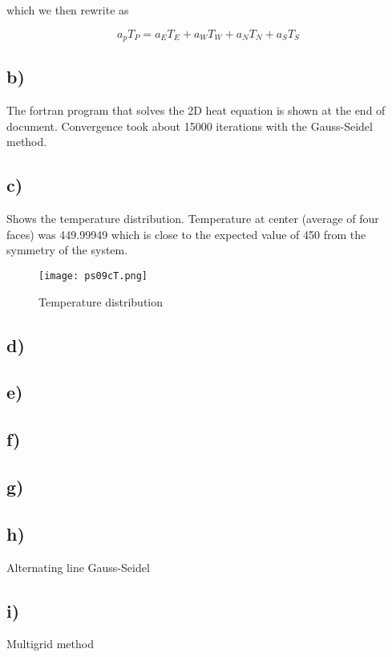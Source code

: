 \documentclass{article}
\begin{document}
which we then rewrite as

\begin{equation}
a_p T_P = a_E T_E + a_W T_W + a_N T_N + a_S T_S
\end{equation}


\subsection{b)}

The fortran program that solves the 2D heat equation is shown at the end of document. Convergence took about 15000 iterations with the Gauss-Seidel method.

\subsection{c)}

Shows the temperature distribution. Temperature at center (average of four faces) was 449.99949 which is close to the expected value of 450 from the symmetry of the system.

\begin{figure}
\texttt{[image: ps09cT.png]}
\caption{Temperature distribution}
\label{fig:tdist}
\end{figure}

\subsection{d)}


\subsection{e)}


\subsection{f)}


\subsection{g)}


\subsection{h)}

Alternating line Gauss-Seidel

\subsection{i)}

Multigrid method


\end{document}
